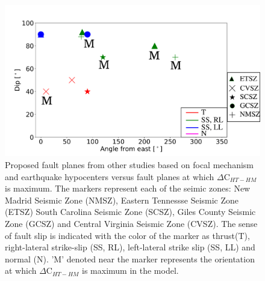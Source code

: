 \documentclass[draft,linenumbers]{agujournal2018}
\begin{document}
\begin{figure}[ht]
    \centering
    \includegraphics[width=0.8\linewidth]{figures/summ_stress.png}
    \caption{Proposed fault planes from other studies based on focal mechanism and earthquake hypocenters versus fault planes at which $\Delta$C$_{HT-HM}$ is maximum. The markers represent each of the seimic zones: New Madrid Seismic Zone (NMSZ), Eastern Tennessse Seismic Zone (ETSZ) South Carolina Seismic Zone (SCSZ), Giles County Seismic Zone (GCSZ) and Central Virginia Seismic Zone (CVSZ). The sense of fault slip is indicated with the color of the marker as thrust(T), right-lateral strike-slip (SS, RL), left-lateral strike slip (SS, LL) and normal (N). 'M' denoted near the marker represents the orientation at which $\Delta$C$_{HT-HM}$ is maximum in the model.}
    \label{summary}
\end{figure}
 
\end{document}
